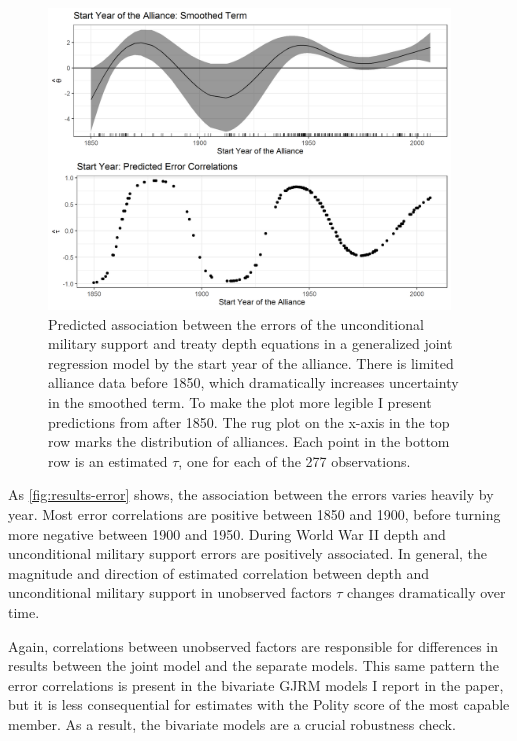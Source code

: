 \documentclass[12pt]{article}
\begin{document}
\begin{figure}[hbtp]
\centering
\includegraphics[width=0.95\textwidth]{results-error.png}
\caption{Predicted association between the errors of the unconditional military support and treaty depth equations in a generalized joint regression model by the start year of the alliance. There is limited alliance data before 1850, which dramatically increases uncertainty in the smoothed term. To make the plot more legible I present predictions from after 1850. The rug plot on the x-axis in the top row marks the distribution of alliances. Each point in the bottom row is an estimated $\tau$, one for each of the 277 observations.}
\label{fig:results-error}
\end{figure}


As \autoref{fig:results-error} shows, the association between the errors varies heavily by year. 
Most error correlations are positive between 1850 and 1900, before turning more negative between 1900 and 1950. 
During World War II depth and unconditional military support errors are positively associated. 
In general, the magnitude and direction of estimated correlation between depth and unconditional military support in unobserved factors $\tau$ changes dramatically over time.  


Again, correlations between unobserved factors are responsible for differences in results between the joint model and the separate models. 
This same pattern the error correlations is present in the bivariate GJRM models I report in the paper, but it is less consequential for estimates with the Polity score of the most capable member. 
As a result, the bivariate models are a crucial robustness check. 
\end{document}
